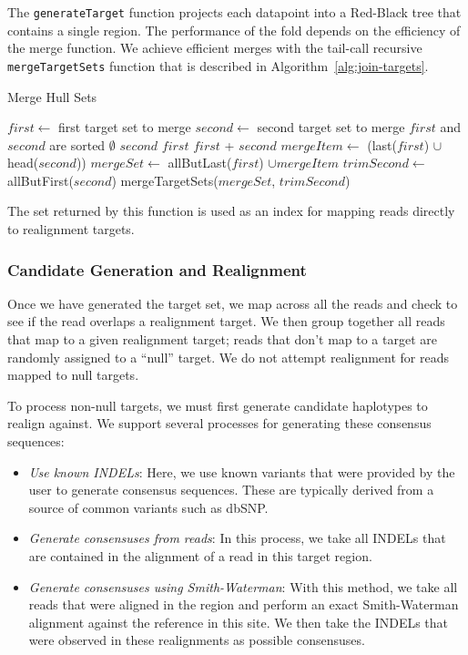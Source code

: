 \documentclass[masters]{ucbthesis}
\begin{document}
The \texttt{generateTarget} function projects each datapoint into a Red-Black tree that contains a
single region. The performance of the fold depends on the efficiency of the merge function. We achieve
efficient merges with the tail-call recursive \texttt{mergeTargetSets} function that is described in
Algorithm~\ref{alg:join-targets}.

\begin{algorithm}
\caption{Merge Hull Sets}
\label{alg:join-targets}
\begin{algorithmic}
\STATE $first \leftarrow$ first target set to merge
\STATE $second \leftarrow$ second target set to merge
\REQUIRE $first$ and $second$ are sorted
\RETURN $\emptyset$
\RETURN $second$
\RETURN $first$
\ELSE
{}
\RETURN $first$ + $second$
\ELSE
\STATE $mergeItem \leftarrow$ (last($first$) $\cup$ head($second$))
\STATE $mergeSet \leftarrow$ allButLast($first$) $\cup mergeItem$
\STATE $trimSecond \leftarrow$ allButFirst($second$)
\RETURN mergeTargetSets($mergeSet$, $trimSecond$)
\ENDIF
\ENDIF
\end{algorithmic}
\end{algorithm}

The set returned by this function is used as an index for mapping reads directly to realignment targets.

\subsubsection{Candidate Generation and Realignment}
\label{sec:candidate-generation-realignment}

Once we have generated the target set, we map across all the reads and check to see if the read overlaps
a realignment target. We then group together all reads that map to a given realignment target; reads that
don't map to a target are randomly assigned to a ``null'' target. We do not attempt realignment for reads mapped
to null targets.

To process non-null targets, we must first generate candidate haplotypes to realign against. We support several
processes for generating these consensus sequences:

\begin{itemize}
\item \emph{Use known INDELs}: Here, we use known variants that were provided by the user to generate
consensus sequences. These are typically derived from a source of common variants such as dbSNP.
\item \emph{Generate consensuses from reads}: In this process, we take all INDELs that are contained in
the alignment of a read in this target region.
\item \emph{Generate consensuses using Smith-Waterman}: With this method, we take all reads that were
aligned in the region and perform an exact Smith-Waterman alignment against the reference in this site. We
then take the INDELs that were observed in these realignments as possible consensuses. 
\end{itemize}
\end{document}
